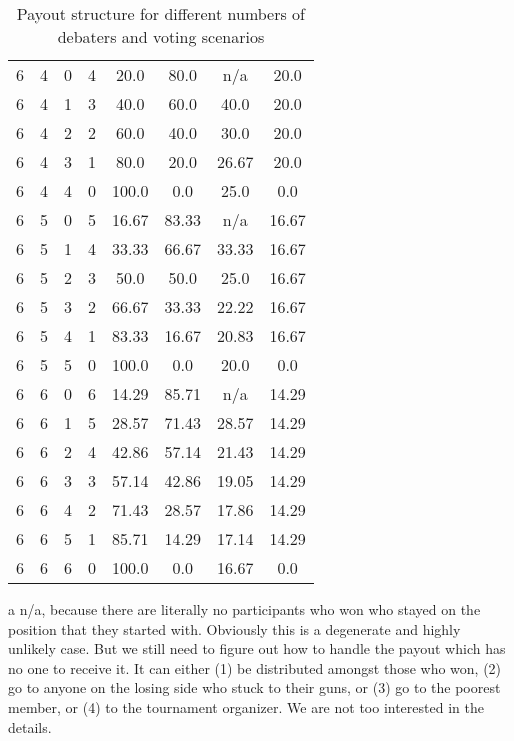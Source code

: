 \begin{enumerate}
\begin{table}[h]
\begin{threeparttable}
\begin{tabular}{cccccccc}
6 & 4 & 0 & 4 & 20.0 & 80.0 & n/a\tnote{a} & 20.0 \\
6 & 4 & 1 & 3 & 40.0 & 60.0 & 40.0 & 20.0 \\
6 & 4 & 2 & 2 & 60.0 & 40.0 & 30.0 & 20.0 \\
6 & 4 & 3 & 1 & 80.0 & 20.0 & 26.67 & 20.0 \\
6 & 4 & 4 & 0 & 100.0 & 0.0 & 25.0 & 0.0 \\
6 & 5 & 0 & 5 & 16.67 & 83.33 & n/a\tnote{a} & 16.67 \\
6 & 5 & 1 & 4 & 33.33 & 66.67 & 33.33 & 16.67 \\
6 & 5 & 2 & 3 & 50.0 & 50.0 & 25.0 & 16.67 \\
6 & 5 & 3 & 2 & 66.67 & 33.33 & 22.22 & 16.67 \\
6 & 5 & 4 & 1 & 83.33 & 16.67 & 20.83 & 16.67 \\
6 & 5 & 5 & 0 & 100.0 & 0.0 & 20.0 & 0.0 \\
6 & 6 & 0 & 6 & 14.29 & 85.71 & n/a\tnote{a} & 14.29 \\
6 & 6 & 1 & 5 & 28.57 & 71.43 & 28.57 & 14.29 \\
6 & 6 & 2 & 4 & 42.86 & 57.14 & 21.43 & 14.29 \\
6 & 6 & 3 & 3 & 57.14 & 42.86 & 19.05 & 14.29 \\
6 & 6 & 4 & 2 & 71.43 & 28.57 & 17.86 & 14.29 \\
6 & 6 & 5 & 1 & 85.71 & 14.29 & 17.14 & 14.29 \\
6 & 6 & 6 & 0 & 100.0 & 0.0 & 16.67 & 0.0 \\
\bottomrule
\end{tabular}
\begin{tablenotes}
    \item[a] n/a, because there are literally no participants who won who stayed on the position that they started with. 
    Obviously this is a degenerate and highly unlikely case. But we still need to figure out how to handle the payout which has no one to receive it. It can either (1) be distributed amongst those who won, (2) go to anyone on the losing side who stuck to their guns, or (3) go to the poorest member, or (4) to the tournament organizer. We are not too interested in the details. 
\end{tablenotes}
\end{threeparttable}

\caption{Payout structure for different numbers of debaters and voting scenarios}
\end{table}


\end{enumerate}
